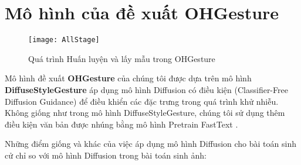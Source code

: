 


\pagebreak

\section{Mô hình của đề xuất OHGesture}
\label{sec:ohgesture}



\begin{figure}[H]
	\centering
	\texttt{[image: AllStage]}
	\caption{Quá trình Huấn luyện và lấy mẫu trong OHGesture}
	\label{fig:TrainingAndSampling}
\end{figure}

Mô hình đề xuất \textbf{OHGesture} của chúng tôi được dựa trên mô hình \textbf{DiffuseStyleGesture} \cite{yang2023diffusestylegesture} áp dụng mô hình Diffusion \cite{ho2020denoising} có điều kiện \cite{ho2022classifier} (Classifier-Free Diffusion Guidance) để điều khiển các đặc trưng trong quá trình khử nhiễu. 
Không giống như trong mô hình DiffuseStyleGesture, chúng tôi sử dụng thêm điều kiện văn bản được nhúng bằng mô hình Pretrain FastText  \cite{bojanowski2017enriching}.

Những điểm giống và khác của việc áp dụng mô hình Diffusion cho bài toán sinh cử chỉ so với mô hình Diffusion trong bài toán sinh ảnh:

